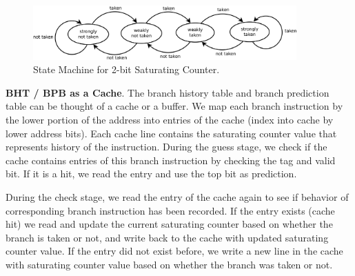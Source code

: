 \begin{figure}[hbt]
\begin{center}
\includegraphics[width=0.9\textwidth]{figs/saturating_counter.png}

\caption{State Machine for 2-bit Saturating Counter.}
\end{center}
\end{figure}


\newpage
\textbf{BHT / BPB as a Cache}. The branch history table and branch prediction table can be thought of a cache or a buffer. We map each branch instruction by the lower portion of the address into entries of the cache (index into cache by lower address bits). Each cache line contains the saturating counter value that represents history of the instruction. During the guess stage, we check if the cache contains entries of this branch instruction by checking the tag and valid bit. If it is a hit, we read the entry and use the top bit as prediction. 

During the check stage, we read the entry of the cache again to see if behavior of corresponding branch instruction has been recorded. If the entry exists (cache hit) we read and update the current saturating counter based on whether the branch is taken or not, and write back to the cache with updated saturating counter value. If the entry did not exist before, we write a new line in the cache with saturating counter value based on whether the branch was taken or not.


